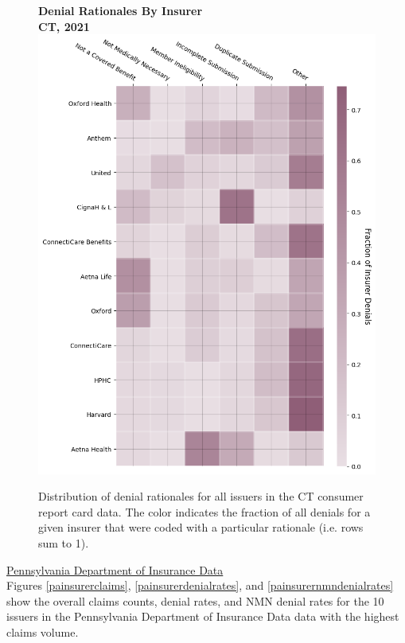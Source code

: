\documentclass[12pt, a4paper,twoside,parskip=full]{report}
\theoremstyle{plain} %
\theoremstyle{definition} %
\theoremstyle{remark} %
\numberwithin{equation}{chapter}
\begin{document}
		
		\begin{figure}[h!]
			\centering
			\textbf{Denial Rationales By Insurer}\\
			\textbf{CT, 2021}\\
			\includegraphics[width=\columnwidth]{images/ct_claims/insurer_vs_denial_cat.png}
			\caption{Distribution of denial rationales for all issuers in the CT consumer report card data. The color indicates the fraction of all denials for a given insurer that were coded with a particular rationale (i.e. rows sum to 1).}
			\label{ctdenialrationalesbyinsurer}
		\end{figure}
		
		\clearpage
		
		
		\underline{Pennsylvania Department of Insurance Data} \\
		
		
		Figures \ref{painsurerclaims}, \ref{painsurerdenialrates}, and \ref{painsurernmndenialrates} show the overall claims counts, denial rates, and NMN denial rates for the 10 issuers in the Pennsylvania Department of Insurance Data data with the highest claims volume.
	
\end{document}
